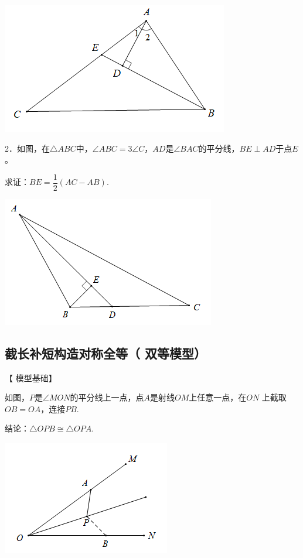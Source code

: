 \documentclass[10pt]{ctexart}
\begin{document}
\begin{flushright}
	\includegraphics[scale=0.6]{figure/jiaopfxian09}
\end{flushright}

\begin{shaded}
2．如图，在$\triangle ABC$中，$\angle ABC=3\angle C$，$AD$是$\angle BAC$的平分线，$BE\perp AD$于点$E$。
 
求证：$BE=\dfrac{1}{2}(AC-AB)$.
\end{shaded}

\begin{flushright}
	\includegraphics[scale=0.6]{figure/jiaopfxian10}
\end{flushright}

\subsection[双等模型]{截长补短构造对称全等（ 双等模型）}

【 {\heiti 模型基础}】

如图，$P$是$\angle MON$的平分线上一点，点$A$是射线$OM$上任意一点，在$ON$
上截取$OB=OA$，连接$PB$.

结论：$\triangle OPB\cong \triangle OPA$.

\begin{flushright}
	\includegraphics[scale=0.6]{figure/jiaopfxian11}
\end{flushright}
\end{document}
